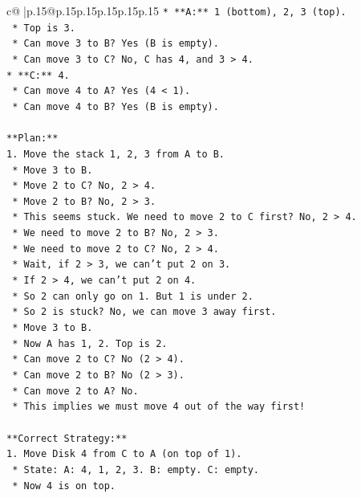 \documentclass{article}
\begin{document}
{\begin{supertabular}{c@{$\;$}|p{.15\linewidth}@{}p{.15\linewidth}p{.15\linewidth}p{.15\linewidth}p{.15\linewidth}p{.15\linewidth}}
{{{\texttt{*   **A:** 1 (bottom), 2, 3 (top).} \\
\texttt{    *   Top is 3.} \\
\texttt{    *   Can move 3 to B? Yes (B is empty).} \\
\texttt{    *   Can move 3 to C? No, C has 4, and 3 > 4.} \\
\texttt{*   **C:** 4.} \\
\texttt{    *   Can move 4 to A? Yes (4 < 1).} \\
\texttt{    *   Can move 4 to B? Yes (B is empty).} \\
\\ 
\texttt{**Plan:**} \\
\texttt{1.  Move the stack 1, 2, 3 from A to B.} \\
\texttt{    *   Move 3 to B.} \\
\texttt{    *   Move 2 to C? No, 2 > 4.} \\
\texttt{    *   Move 2 to B? No, 2 > 3.} \\
\texttt{    *   This seems stuck. We need to move 2 to C first? No, 2 > 4.} \\
\texttt{    *   We need to move 2 to B? No, 2 > 3.} \\
\texttt{    *   We need to move 2 to C? No, 2 > 4.} \\
\texttt{    *   Wait, if 2 > 3, we can't put 2 on 3.} \\
\texttt{    *   If 2 > 4, we can't put 2 on 4.} \\
\texttt{    *   So 2 can only go on 1. But 1 is under 2.} \\
\texttt{    *   So 2 is stuck? No, we can move 3 away first.} \\
\texttt{    *   Move 3 to B.} \\
\texttt{    *   Now A has 1, 2. Top is 2.} \\
\texttt{    *   Can move 2 to C? No (2 > 4).} \\
\texttt{    *   Can move 2 to B? No (2 > 3).} \\
\texttt{    *   Can move 2 to A? No.} \\
\texttt{    *   This implies we must move 4 out of the way first!} \\
\\ 
\texttt{**Correct Strategy:**} \\
\texttt{1.  Move Disk 4 from C to A (on top of 1).} \\
\texttt{    *   State: A: 4, 1, 2, 3. B: empty. C: empty.} \\
\texttt{    *   Now 4 is on top.} \\
}}}
\end{supertabular}}
\end{document}
